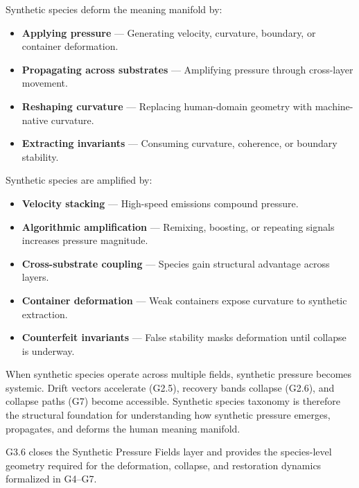 \medskip

\noindent Synthetic species deform the meaning manifold by:

\begin{itemize}[leftmargin=1.2cm]
    \item \textbf{Applying pressure} — Generating velocity, curvature, boundary,
    or container deformation.

    \item \textbf{Propagating across substrates} — Amplifying pressure through
    cross-layer movement.

    \item \textbf{Reshaping curvature} — Replacing human-domain geometry with
    machine-native curvature.

    \item \textbf{Extracting invariants} — Consuming curvature, coherence, or
    boundary stability.
\end{itemize}

\medskip

\noindent Synthetic species are amplified by:

\begin{itemize}[leftmargin=1.2cm]
    \item \textbf{Velocity stacking} — High-speed emissions compound pressure.

    \item \textbf{Algorithmic amplification} — Remixing, boosting, or repeating
    signals increases pressure magnitude.

    \item \textbf{Cross-substrate coupling} — Species gain structural advantage
    across layers.

    \item \textbf{Container deformation} — Weak containers expose curvature to
    synthetic extraction.

    \item \textbf{Counterfeit invariants} — False stability masks deformation
    until collapse is underway.
\end{itemize}

\medskip

\noindent When synthetic species operate across multiple fields, synthetic
pressure becomes systemic. Drift vectors accelerate (G2.5), recovery bands
collapse (G2.6), and collapse paths (G7) become accessible. Synthetic species
taxonomy is therefore the structural foundation for understanding how synthetic
pressure emerges, propagates, and deforms the human meaning manifold.

\medskip

\noindent G3.6 closes the Synthetic Pressure Fields layer and provides the
species-level geometry required for the deformation, collapse, and restoration
dynamics formalized in G4--G7.
